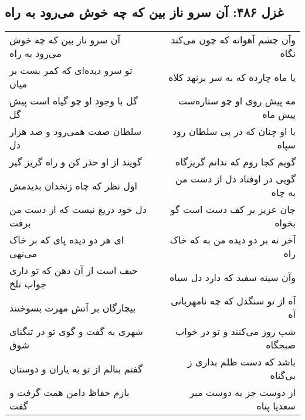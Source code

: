 \begin{center}
\section*{غزل ۴۸۶: آن سرو ناز بین که چه خوش می‌رود به راه}
\label{sec:486}
\begin{longtable}{l p{0.5cm} r}
آن سرو ناز بین که چه خوش می‌رود به راه
&&
وآن چشم آهوانه که چون می‌کند نگاه
\\
تو سرو دیده‌ای که کمر بست بر میان
&&
یا ماه چارده که به سر برنهد کلاه
\\
گل با وجود او چو گیاه است پیش گل
&&
مه پیش روی او چو ستاره‌ست پیش ماه
\\
سلطان صفت همی‌رود و صد هزار دل
&&
با او چنان که در پی سلطان رود سپاه
\\
گویند از او حذر کن و راه گریز گیر
&&
گویم کجا روم که ندانم گریزگاه
\\
اول نظر که چاه زنخدان بدیدمش
&&
گویی در اوفتاد دل از دست من به چاه
\\
دل خود دریغ نیست که از دست من برفت
&&
جان عزیز بر کف دست است گو بخواه
\\
ای هر دو دیده پای که بر خاک می‌نهی
&&
آخر نه بر دو دیده من به که خاک راه
\\
حیف است از آن دهن که تو داری جواب تلخ
&&
وآن سینه سفید که دارد دل سیاه
\\
بیچارگان بر آتش مهرت بسوختند
&&
آه از تو سنگدل که چه نامهربانی آه
\\
شهری به گفت و گوی تو در تنگنای شوق
&&
شب روز می‌کنند و تو در خواب صبحگاه
\\
گفتم بنالم از تو به یاران و دوستان
&&
باشد که دست ظلم بداری ز بی‌گناه
\\
بازم حفاظ دامن همت گرفت و گفت
&&
از دوست جز به دوست مبر سعدیا پناه
\\
\end{longtable}
\end{center}
